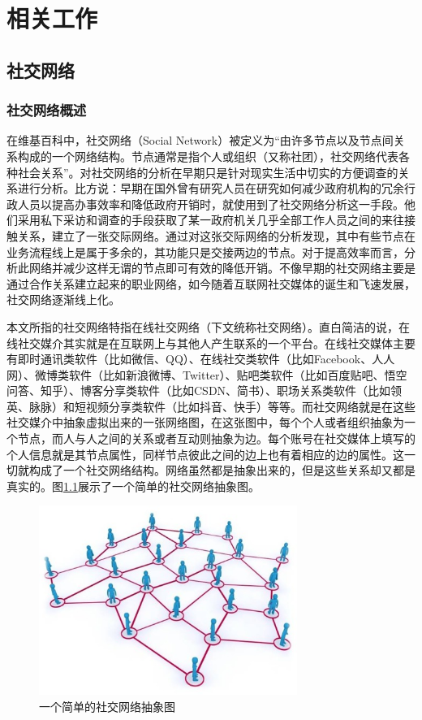 \chapter{相关工作}
\section{社交网络}
\subsection{社交网络概述}
在维基百科中，社交网络（Social Network）被定义为“由许多节点以及节点间关系构成的一个网络结构。节点通常是指个人或组织（又称社团），社交网络代表各种社会关系”。对社交网络的分析在早期只是针对现实生活中切实的方便调查的关系进行分析。比方说：早期在国外曾有研究人员在研究如何减少政府机构的冗余行政人员以提高办事效率和降低政府开销时，就使用到了社交网络分析这一手段。他们采用私下采访和调查的手段获取了某一政府机关几乎全部工作人员之间的来往接触关系，建立了一张交际网络。通过对这张交际网络的分析发现，其中有些节点在业务流程线上是属于多余的，其功能只是交接两边的节点。对于提高效率而言，分析此网络并减少这样无谓的节点即可有效的降低开销。不像早期的社交网络主要是通过合作关系建立起来的职业网络，如今随着互联网社交媒体的诞生和飞速发展，社交网络逐渐线上化。

本文所指的社交网络特指在线社交网络（下文统称社交网络）。直白简洁的说，在线社交媒介其实就是在互联网上与其他人产生联系的一个平台。在线社交媒体主要有即时通讯类软件（比如微信、QQ）、在线社交类软件（比如Facebook、人人网）、微博类软件（比如新浪微博、Twitter）、贴吧类软件（比如百度贴吧、悟空问答、知乎）、博客分享类软件（比如CSDN、简书）、职场关系类软件（比如领英、脉脉）和短视频分享类软件（比如抖音、快手）等等。而社交网络就是在这些社交媒介中抽象虚拟出来的一张网络图，在这张图中，每个个人或者组织抽象为一个节点，而人与人之间的关系或者互动则抽象为边。每个账号在社交媒体上填写的个人信息就是其节点属性，同样节点彼此之间的边上也有着相应的边的属性。这一切就构成了一个社交网络结构。网络虽然都是抽象出来的，但是这些关系却又都是真实的。图\ref{fig:fig2-0}展示了一个简单的社交网络抽象图。

\begin{figure}
  \centering
  \includegraphics[width=0.75\textwidth]{figures/fig2-0}
  \caption{一个简单的社交网络抽象图}\label{fig:fig2-0}
\end{figure}

